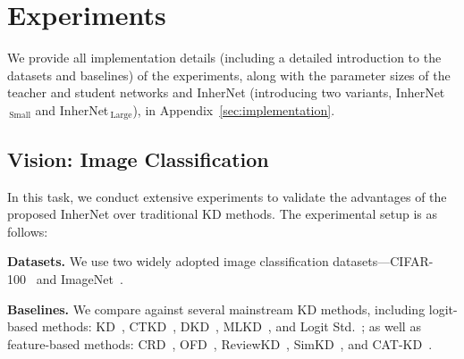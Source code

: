 \documentclass{article} %
\begin{document}
\section{Experiments}
\label{sec:experiments}


We provide all implementation details (including a detailed introduction to the datasets and baselines) of the experiments, along with the parameter sizes of the teacher and student networks and InherNet (introducing two variants, InherNet$_{\ \text{Small}}$ and InherNet$_{\ \text{Large}}$), in Appendix~\ref{sec:implementation}.









\subsection{Vision: Image Classification}
\label{sec:vision}



In this task, we conduct extensive experiments to validate the advantages of the proposed InherNet over traditional KD methods. The experimental setup is as follows:

\textbf{Datasets.} We use two widely adopted image classification datasets—CIFAR-100~\citep{krizhevsky2009learning} and ImageNet~\citep{russakovsky2015imagenet}.

\textbf{Baselines.} We compare against several mainstream KD methods, including logit-based methods: KD~\citep{hinton2015distilling}, CTKD~\citep{li2022curriculum}, DKD~\citep{zhao2022decoupled}, MLKD~\citep{jin2023multi}, and Logit Std.~\citep{sun2024logit}; as well as feature-based methods: CRD~\citep{peng2019correlation}, OFD~\citep{heo2019comprehensive}, ReviewKD~\citep{chen2021distilling}, SimKD~\citep{chen2022knowledge}, and CAT-KD~\citep{guo2023class}.
\end{document}
